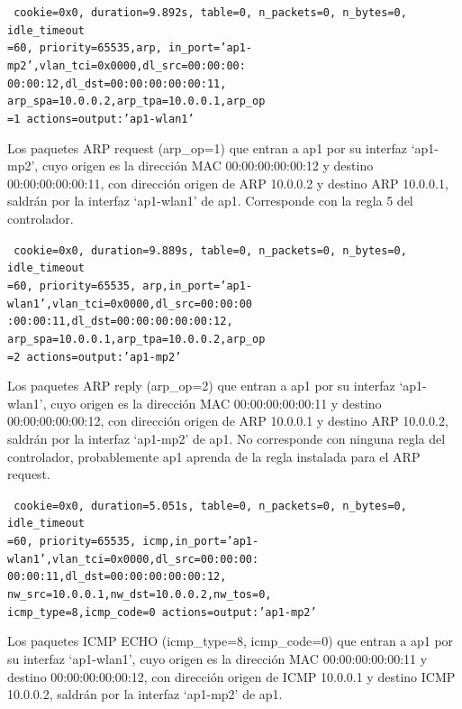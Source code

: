 \documentclass[a4paper,12pt,twoside,spanish]{book}
\begin{document}
\noindent\texttt{
	cookie=0x0, duration=9.892s, table=0, n\_packets=0, n\_bytes=0, idle\_timeout\\
	=60, priority=65535,arp,
	in\_port='ap1-mp2',vlan\_tci=0x0000,dl\_src=00:00:00:\\
	00:00:12,dl\_dst=00:00:00:00:00:11,
	arp\_spa=10.0.0.2,arp\_tpa=10.0.0.1,arp\_op\\
	=1 actions=output:'ap1-wlan1'
} 

Los paquetes ARP request (arp\_op=1) que entran a ap1 por su interfaz ‘ap1-mp2’, cuyo origen es la dirección MAC 00:00:00:00:00:12 y destino 00:00:00:00:00:11, con dirección origen de ARP 10.0.0.2 y destino ARP 10.0.0.1, saldrán por la interfaz ‘ap1-wlan1’ de ap1. Corresponde con la regla 5 del controlador.\par 

\noindent\texttt{
	cookie=0x0, duration=9.889s, table=0, n\_packets=0, n\_bytes=0, idle\_timeout\\
	=60, priority=65535,
	arp,in\_port='ap1-wlan1',vlan\_tci=0x0000,dl\_src=00:00:00\\
	:00:00:11,dl\_dst=00:00:00:00:00:12,
	arp\_spa=10.0.0.1,arp\_tpa=10.0.0.2,arp\_op\\
	=2 actions=output:'ap1-mp2'
}

Los paquetes ARP reply (arp\_op=2) que entran a ap1 por su interfaz ‘ap1-wlan1’, cuyo origen es la dirección MAC 00:00:00:00:00:11 y destino 00:00:00:00:00:12, con dirección origen de ARP 10.0.0.1 y destino ARP 10.0.0.2, saldrán por la interfaz ‘ap1-mp2’ de ap1. No corresponde con ninguna regla del controlador, probablemente ap1 aprenda de la regla instalada para el ARP request.\par 

\noindent\texttt{
	cookie=0x0, duration=5.051s, table=0, n\_packets=0, n\_bytes=0, idle\_timeout\\
	=60, priority=65535,
	icmp,in\_port='ap1-wlan1',vlan\_tci=0x0000,dl\_src=00:00:00:\\
	00:00:11,dl\_dst=00:00:00:00:00:12,
	nw\_src=10.0.0.1,nw\_dst=10.0.0.2,nw\_tos=0,\\
	icmp\_type=8,icmp\_code=0 actions=output:'ap1-mp2'
}

Los paquetes ICMP ECHO (icmp\_type=8, icmp\_code=0) que entran a ap1 por su interfaz ‘ap1-wlan1’, cuyo origen es la dirección MAC 00:00:00:00:00:11 y destino 00:00:00:00:00:12, con dirección origen de ICMP 10.0.0.1 y destino ICMP 10.0.0.2, saldrán por la interfaz ‘ap1-mp2’ de ap1.\par 
\end{document}
